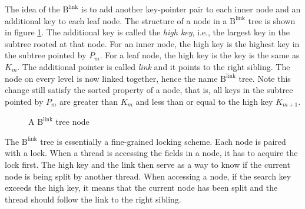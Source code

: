 \documentclass[11pt]{report}
\theoremstyle{definition}
\begin{document}
The idea of the $\text{B}^{\text{link}}$ is to add another key-pointer pair to each inner node and an additional key to each leaf node. The structure of a node in a $\text{B}^{\text{link}}$ tree is shown in figure \ref{fig:blink_node}. The additional key is called the \textit{high key}, i.e., the largest key in the subtree rooted at that node. For an inner node, the high key is the highest key in the subtree pointed by $P_m$. For a leaf node, the high key is the key is the same as $K_m$. The additional pointer is called \textit{link} and it points to the right sibling. The node on every level is now linked together, hence the name $\text{B}^{\text{link}}$ tree. Note this change still satisfy the sorted property of a node, that is, all keys in the subtree pointed by $P_m$ are greater than $K_m$ and less than or equal to the high key $K_{m+1}$.

\begin{figure}[h]
  \centering
  \vspace{0.5em}
  \caption{A $\text{B}^{\text{link}}$ tree node}
  \label{fig:blink_node}
\end{figure}

The $\text{B}^{\text{link}}$ tree is essentially a fine-grained locking scheme. Each node is paired with a lock. When a thread is accessing the fields in a node, it has to acquire the lock first. The high key and the link then serve as a way to know if the current node is being split by another thread. When accessing a node, if the search key  exceeds the high key, it means that the current node has been split and the thread should follow the link to the right sibling.
\end{document}
